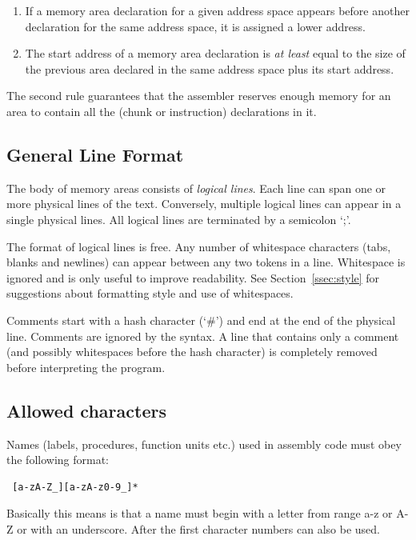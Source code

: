 \documentclass[twoside]{tceusermanual}
\begin{document}
\begin{enumerate}
\item %
  If a memory area declaration for a given address space appears before
  another declaration for the same address space, it is assigned a lower
  address.
\item %
  The start address of a memory area declaration is \emph{at least} equal to
  the size of the previous area declared in the same address space plus its
  start address.
\end{enumerate}

The second rule guarantees that the assembler reserves enough memory for an
area to contain all the (chunk or instruction) declarations in it.

\subsection{General Line Format}
\label{ssec:lines}

The body of memory areas consists of \emph{logical lines}.  Each line can
span one or more physical lines of the text. Conversely, multiple logical
lines can appear in a single physical lines.  All logical lines are
terminated by a semicolon `;'.

The format of logical lines is free. Any number of whitespace characters
(tabs, blanks and newlines) can appear between any two tokens in a line.
Whitespace is ignored and is only useful to improve readability. See
Section~\ref{ssec:style} for suggestions about formatting style and use of
whitespaces.

Comments start with a hash character (`\#') and end at the end of the
physical line.  Comments are ignored by the syntax.  A line that contains
only a comment (and possibly whitespaces before the hash character) is
completely removed before interpreting the program.

\subsection{Allowed characters}
\label{sec:names}

Names (labels, procedures, function units etc.) used in assembly code must
obey the following format:

\begin{verbatim}
 [a-zA-Z_][a-zA-z0-9_]*
\end{verbatim}

Basically this means is that a name must begin with a letter from range
a-z or A-Z or with an underscore. After the first character numbers can also
be used.
\end{document}
